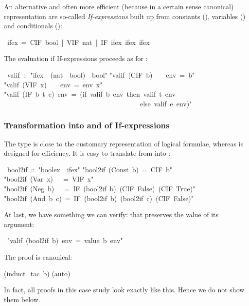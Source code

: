 \begin{isabelle}
\begin{isamarkuptext}
An alternative and often more efficient (because in a certain sense
canonical) representation are so-called \emph{If-expressions} built up
from constants (), variables () and conditionals
():%
\end{isamarkuptext}%
\ ifex\ =\ CIF\ bool\ |\ VIF\ nat\ |\ IF\ ifex\ ifex\ ifex%
\begin{isamarkuptext}%
\noindent
The evaluation if If-expressions proceeds as for :%
\end{isamarkuptext}%
\ valif\ ::\ {"}ifex\ {\isasymRightarrow}\ (nat\ {\isasymRightarrow}\ bool)\ {\isasymRightarrow}\ bool{"}\isanewline
{}\isanewline
{"}valif\ (CIF\ b)\ \ \ \ env\ =\ b{"}\isanewline
{"}valif\ (VIF\ x)\ \ \ \ env\ =\ env\ x{"}\isanewline
{"}valif\ (IF\ b\ t\ e)\ env\ =\ (if\ valif\ b\ env\ then\ valif\ t\ env\isanewline
\ \ \ \ \ \ \ \ \ \ \ \ \ \ \ \ \ \ \ \ \ \ \ \ \ \ \ \ \ \ \ \ \ \ \ \ \ \ \ \ else\ valif\ e\ env){"}%
\begin{isamarkuptext}%
\subsubsection{Transformation into and of If-expressions}

The type  is close to the customary representation of logical
formulae, whereas  is designed for efficiency. It is easy to
translate from  into :%
\end{isamarkuptext}%
\ bool2if\ ::\ {"}boolex\ {\isasymRightarrow}\ ifex{"}\isanewline
{}\isanewline
{"}bool2if\ (Const\ b)\ =\ CIF\ b{"}\isanewline
{"}bool2if\ (Var\ x)\ \ \ =\ VIF\ x{"}\isanewline
{"}bool2if\ (Neg\ b)\ \ \ =\ IF\ (bool2if\ b)\ (CIF\ False)\ (CIF\ True){"}\isanewline
{"}bool2if\ (And\ b\ c)\ =\ IF\ (bool2if\ b)\ (bool2if\ c)\ (CIF\ False){"}%
\begin{isamarkuptext}%
\noindent
At last, we have something we can verify: that  preserves the
value of its argument:%
\end{isamarkuptext}%
\ {"}valif\ (bool2if\ b)\ env\ =\ value\ b\ env{"}%
\begin{isamarkuptxt}%
\noindent
The proof is canonical:%
\end{isamarkuptxt}%
(induct\_tac\ b)\isanewline
{}(auto)%
\begin{isamarkuptext}%
\noindent
In fact, all proofs in this case study look exactly like this. Hence we do
not show them below.


\end{isamarkuptext}
\end{isabelle}
